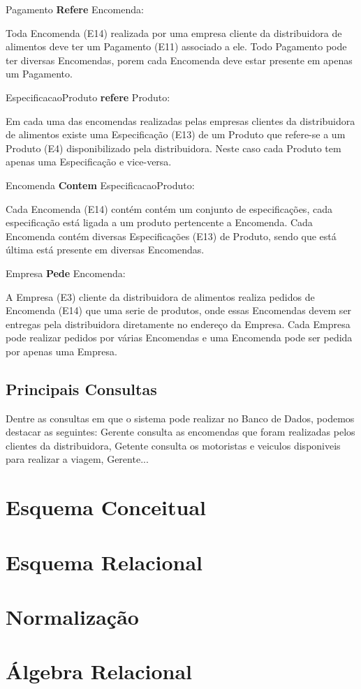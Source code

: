\documentclass[12pt, onecolumn, titlepage]{article}
\begin{document}
\begin{description}
\item Pagamento \textbf{Refere} Encomenda: 
\item \qquad Toda Encomenda (E14) realizada por uma empresa cliente da distribuidora de alimentos deve ter um Pagamento (E11) associado a ele. Todo Pagamento pode ter diversas Encomendas, porem cada Encomenda deve estar presente em apenas um Pagamento.

\item EspecificacaoProduto \textbf{refere} Produto: 
\item \qquad Em cada uma das encomendas realizadas pelas empresas clientes da distribuidora de alimentos existe uma Especificação (E13) de um Produto que refere-se a um Produto (E4) disponibilizado pela distribuidora. Neste caso cada Produto tem apenas uma Especificação e vice-versa. 

\item Encomenda \textbf{Contem} EspecificacaoProduto: 
\item \qquad Cada Encomenda (E14) contém contém um conjunto de especificações, cada especificação está ligada a um produto pertencente a Encomenda. Cada Encomenda contém diversas Especificações (E13) de Produto, sendo que está última está presente em diversas Encomendas.

\item Empresa \textbf{Pede} Encomenda: 
\item \qquad A Empresa (E3) cliente da distribuidora de alimentos realiza pedidos de Encomenda (E14) que uma serie de produtos, onde essas Encomendas devem ser entregas pela distribuidora diretamente no endereço da Empresa. Cada Empresa pode realizar pedidos por várias Encomendas e uma Encomenda pode ser pedida por apenas uma Empresa.

\end{description}

\subsection*{Principais Consultas}
\label{sect:principaisConsultas}

Dentre as consultas em que o sistema pode realizar no Banco de Dados, podemos destacar as seguintes: Gerente consulta as encomendas que foram realizadas pelos clientes da distribuidora, Getente consulta os motoristas e veiculos disponiveis para realizar a viagem, Gerente...

\section{Esquema Conceitual}
\label{sect:conceitual}


\section{Esquema Relacional}
\label{sect:relacional}


\section{Normalização}
\label{sect:normalizacao}


\section{Álgebra Relacional}
\label{sect:algebra}
\end{document}
